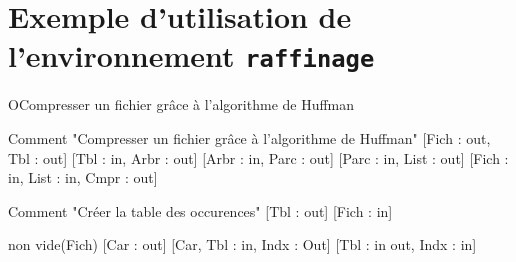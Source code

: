 \documentclass{article}
\begin{document}
\section*{Exemple d'utilisation de l'environnement \texttt{raffinage}}

\begin{raffinage}{O}{Compresser un fichier grâce à l’algorithme de Huffman}
\end{raffinage}

\begin{raffinage}{1}{Comment "Compresser un fichier grâce à l’algorithme de Huffman"}
    [Fich : out, Tbl : out]
    [Tbl : in, Arbr : out]
    [Arbr : in, Parc : out]
    [Parc : in, List : out]
    [Fich : in, List : in, Cmpr : out]
\end{raffinage}

\begin{raffinage}{2}{Comment "Créer la table des occurences"}
    [Tbl : out]
    [Fich : in]
    \begin{whilestructure}{non vide(Fich)}
        [Car : out]
        [Car, Tbl : in, Indx : Out]
        [Tbl : in out, Indx : in]
    \end{whilestructure}
\end{raffinage}
\end{document}
